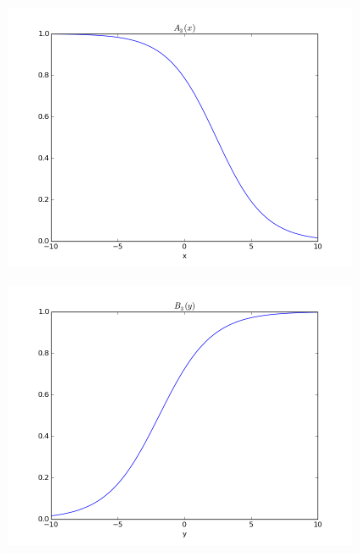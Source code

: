 \documentclass[paper=a4, fontsize=11pt]{scrartcl} %
\numberwithin{equation}{section} %
\numberwithin{figure}{section} %
\numberwithin{table}{section} %
\begin{document}
\begin{figure}[h]
\begin{subfigure}[b]{0.45\textwidth}
\includegraphics[width=\textwidth]{A_B/figure_5.png}
\end{subfigure}
\begin{subfigure}[b]{0.45\textwidth}
\includegraphics[width=\textwidth]{A_B/figure_6.png}
\end{subfigure}


\end{figure}
\end{document}
